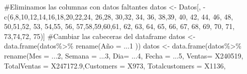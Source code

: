 \documentclass[
  us-letterpaper,
]{scrreprt}
\newenvironment{Shaded}{\begin{snugshade}}{\end{snugshade}}
\newcommand{\AttributeTok}[1]{\textcolor[rgb]{0.40,0.45,0.13}{#1}}
\newcommand{\CommentTok}[1]{\textcolor[rgb]{0.37,0.37,0.37}{#1}}
\newcommand{\DecValTok}[1]{\textcolor[rgb]{0.68,0.00,0.00}{#1}}
\newcommand{\FloatTok}[1]{\textcolor[rgb]{0.68,0.00,0.00}{#1}}
\newcommand{\FunctionTok}[1]{\textcolor[rgb]{0.28,0.35,0.67}{#1}}
\newcommand{\NormalTok}[1]{\textcolor[rgb]{0.00,0.23,0.31}{#1}}
\newcommand{\OtherTok}[1]{\textcolor[rgb]{0.00,0.23,0.31}{#1}}
\newcommand{\SpecialCharTok}[1]{\textcolor[rgb]{0.37,0.37,0.37}{#1}}
\theoremstyle{definition}
\theoremstyle{plain}
\theoremstyle{plain}
\theoremstyle{remark}
\begin{document}
\begin{Shaded}
\begin{Highlighting}[]
\CommentTok{\#Eliminamos las columnas con datos faltantes}
\NormalTok{datos }\OtherTok{\textless{}{-}}\NormalTok{ Datos[, }\SpecialCharTok{{-}}\FunctionTok{c}\NormalTok{(}\DecValTok{6}\NormalTok{,}\DecValTok{8}\NormalTok{,}\DecValTok{10}\NormalTok{,}\DecValTok{12}\NormalTok{,}\DecValTok{14}\NormalTok{,}\DecValTok{16}\NormalTok{,}\DecValTok{18}\NormalTok{,}\DecValTok{20}\NormalTok{,}\DecValTok{22}\NormalTok{,}\DecValTok{24}\NormalTok{, }\DecValTok{26}\NormalTok{,}\DecValTok{28}\NormalTok{, }\DecValTok{30}\NormalTok{,}\DecValTok{32}\NormalTok{, }\DecValTok{34}\NormalTok{, }\DecValTok{36}\NormalTok{,}
                    \DecValTok{38}\NormalTok{,}\DecValTok{39}\NormalTok{, }\DecValTok{40}\NormalTok{,  }\DecValTok{42}\NormalTok{, }\DecValTok{44}\NormalTok{, }\DecValTok{46}\NormalTok{, }\DecValTok{48}\NormalTok{, }\DecValTok{50}\NormalTok{,}\DecValTok{51}\NormalTok{,}\DecValTok{52}\NormalTok{, }\DecValTok{53}\NormalTok{, }\DecValTok{54}\NormalTok{,}\DecValTok{55}\NormalTok{, }\DecValTok{56}\NormalTok{, }
\DecValTok{57}\NormalTok{,}\DecValTok{58}\NormalTok{,}\DecValTok{59}\NormalTok{,}\DecValTok{60}\NormalTok{,}\DecValTok{61}\NormalTok{, }\DecValTok{62}\NormalTok{, }\DecValTok{63}\NormalTok{, }\DecValTok{64}\NormalTok{, }\DecValTok{65}\NormalTok{, }\DecValTok{66}\NormalTok{, }\DecValTok{67}\NormalTok{, }\DecValTok{68}\NormalTok{, }\DecValTok{69}\NormalTok{, }\DecValTok{70}\NormalTok{, }\DecValTok{71}\NormalTok{, }\DecValTok{73}\NormalTok{,}\DecValTok{74}\NormalTok{,}\DecValTok{72}\NormalTok{, }\DecValTok{75}\NormalTok{)]}
\CommentTok{\#Cambiar las cabeceras del dataframe  }
\NormalTok{datos }\OtherTok{\textless{}{-}} \FunctionTok{data.frame}\NormalTok{(datos}\SpecialCharTok{\%\textgreater{}\%} \FunctionTok{rename}\NormalTok{(Año }\OtherTok{=}\NormalTok{ ...}\DecValTok{1}\NormalTok{ ))}
\NormalTok{datos }\OtherTok{\textless{}{-}} \FunctionTok{data.frame}\NormalTok{(datos}\SpecialCharTok{\%\textgreater{}\%} \FunctionTok{rename}\NormalTok{(}\AttributeTok{Mes =}\NormalTok{ ...}\DecValTok{2}\NormalTok{, }\AttributeTok{Semana =}\NormalTok{ ...}\DecValTok{3}\NormalTok{, }\AttributeTok{Dia=}\NormalTok{ ...}\DecValTok{4}\NormalTok{, }
                  \AttributeTok{Fecha =}\NormalTok{ ...}\DecValTok{5}\NormalTok{, }\AttributeTok{Ventas=}\NormalTok{ X240519, }
                  \AttributeTok{TotalVentas =}\NormalTok{ X247172}\FloatTok{.9}\NormalTok{,}\AttributeTok{Customers =}\NormalTok{ X973,}
                  \AttributeTok{Totalcustomers =}\NormalTok{ X1136, }

\end{Highlighting}
\end{Shaded}
\end{document}
